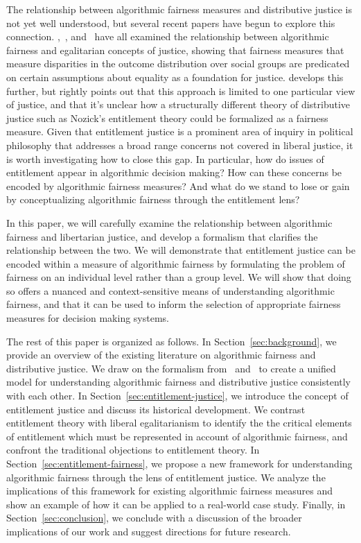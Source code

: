 The relationship between algorithmic fairness measures and distributive justice
is not yet well understood, but several recent papers have begun to explore this
connection. \citep{Binns_2018},~\citep{Hertweck_2024}, and~\citep{Kuppler_2021}
have all examined the relationship between algorithmic fairness and egalitarian
concepts of justice, showing that fairness measures that measure disparities in
the outcome distribution over social groups are predicated on certain
assumptions about equality as a foundation for justice. \citep{Baumann_2023} 
develops this further, but rightly points out that this approach is limited to
one particular view of justice, and that it's unclear how a structurally
different theory of distributive justice such as Nozick's entitlement theory
could be formalized as a fairness measure. Given that entitlement justice is a
prominent area of inquiry in political philosophy that addresses a broad range
concerns not covered in liberal justice, it is worth investigating how to
close this gap. In particular, how do issues of entitlement appear
in algorithmic decision making? How can these concerns be encoded by algorithmic
fairness measures? And what do we stand to lose or gain by conceptualizing
algorithmic fairness through the entitlement lens?

In this paper, we will carefully examine the relationship between algorithmic
fairness and libertarian justice, and develop a formalism that clarifies the
relationship between the two. We will demonstrate that entitlement justice can
be encoded within a measure of algorithmic fairness by formulating the problem
of fairness on an individual level rather than a group level. We will show that
doing so offers a nuanced and context-sensitive means of understanding
algorithmic fairness, and that it can be used to inform the selection of
appropriate fairness measures for decision making systems.

The rest of this paper is organized as follows. In Section~\ref{sec:background},
we provide an overview of the existing literature on algorithmic fairness and
distributive justice. We draw on the formalism from~\citep{Kuppler_2021}
and~\citep{CorbettDavies_2023} to create a unified model for understanding
algorithmic fairness and distributive justice consistently with each other. 
In Section~\ref{sec:entitlement-justice}, we introduce the concept of
entitlement justice and discuss its historical development. We contrast
entitlement theory with liberal egalitarianism to identify the the critical
elements of entitlement which must be represented in account of algorithmic
fairness, and confront the traditional objections to entitlement theory. In
Section~\ref{sec:entitlement-fairness}, we propose a new framework for
understanding algorithmic fairness through the lens of entitlement justice. We
analyze the implications of this framework for existing algorithmic fairness
measures and show an example of how it can be applied to a real-world case
study. Finally, in Section~\ref{sec:conclusion}, we conclude with a discussion
of the broader implications of our work and suggest directions for future
research.
